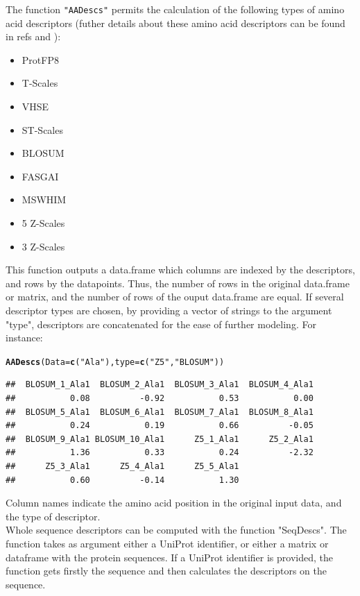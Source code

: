 \documentclass[twoside,a4wide,12pt]{article}\usepackage[]{graphicx}\usepackage[]{color}
\makeatletter
\newcommand{\hlstr}[1]{\textcolor[rgb]{0.192,0.494,0.8}{#1}}%
\newcommand{\hlstd}[1]{\textcolor[rgb]{0.345,0.345,0.345}{#1}}%
\newcommand{\hlkwc}[1]{\textcolor[rgb]{0.333,0.667,0.333}{#1}}%
\newcommand{\hlkwd}[1]{\textcolor[rgb]{0.737,0.353,0.396}{\textbf{#1}}}%
\newenvironment{kframe}{%
 \def\at@end@of@kframe{}%
 \ifinner\ifhmode%
  \def\at@end@of@kframe{\end{minipage}}%
  \begin{minipage}{\columnwidth}%
 \fi\fi%
 \def\FrameCommand##1{\hskip\@totalleftmargin \hskip-\fboxsep
 \colorbox{shadecolor}{##1}\hskip-\fboxsep
     \hskip-\linewidth \hskip-\@totalleftmargin \hskip\columnwidth}%
 \MakeFramed {\advance\hsize-\width
   \@totalleftmargin\z@ \linewidth\hsize
   \@setminipage}}%
 {\par\unskip\endMakeFramed%
 \at@end@of@kframe}
\newenvironment{knitrout}{}{} %
\makeatother
\begin{document}
The function \verb|"AADescs"| permits the calculation of the following types of amino acid descriptors (futher details about these amino acid descriptors can be found in refs \cite{AAs1} and \cite{AAs2}):
\begin{itemize}
\item ProtFP8
\item T-Scales
\item VHSE
\item ST-Scales
\item BLOSUM
\item FASGAI
\item MSWHIM
\item 5 Z-Scales
\item 3 Z-Scales
\end{itemize}
This function outputs a data.frame which columns are indexed by the descriptors, and rows by the datapoints. Thus, the number of rows in the original data.frame or matrix, and the number of rows of the ouput data.frame are equal. 
If several descriptor types are chosen, by providing a vector of strings to the argument "type", descriptors are concatenated for the ease of further modeling. 
For instance: 
\begin{knitrout}
\color{fgcolor}\begin{kframe}
\begin{alltt}
\hlkwd{AADescs}\hlstd{(}\hlkwc{Data} \hlstd{=} \hlkwd{c}\hlstd{(}\hlstr{"Ala"}\hlstd{),} \hlkwc{type} \hlstd{=} \hlkwd{c}\hlstd{(}\hlstr{"Z5"}\hlstd{,} \hlstr{"BLOSUM"}\hlstd{))}
\end{alltt}
\begin{verbatim}
##  BLOSUM_1_Ala1  BLOSUM_2_Ala1  BLOSUM_3_Ala1  BLOSUM_4_Ala1 
##           0.08          -0.92           0.53           0.00 
##  BLOSUM_5_Ala1  BLOSUM_6_Ala1  BLOSUM_7_Ala1  BLOSUM_8_Ala1 
##           0.24           0.19           0.66          -0.05 
##  BLOSUM_9_Ala1 BLOSUM_10_Ala1      Z5_1_Ala1      Z5_2_Ala1 
##           1.36           0.33           0.24          -2.32 
##      Z5_3_Ala1      Z5_4_Ala1      Z5_5_Ala1 
##           0.60          -0.14           1.30
\end{verbatim}
\end{kframe}
\end{knitrout}
Column names indicate the amino acid position in the original input data, and the type of descriptor.
\\
Whole sequence descriptors can be computed with the function "SeqDescs". 
The function takes as argument either a UniProt identifier, or either a matrix or dataframe with the protein sequences.
If a UniProt identifier is provided, the function gets firstly the sequence and then calculates the descriptors on the sequence.
\end{document}
